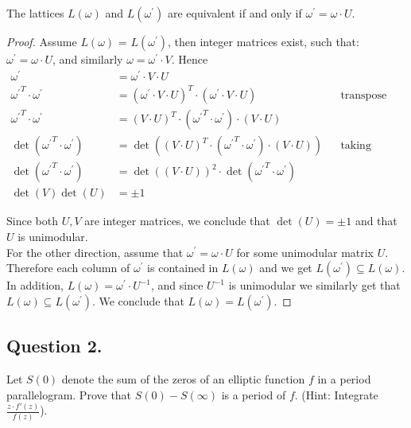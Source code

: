 \begin{proposition}
    The lattices $L(\omega)$ and $L(\omega^\prime)$ are equivalent if and only if $\omega^\prime = \omega \cdot U.$
\end{proposition}

\begin{proof}
    Assume $L(\omega)$ = $L(\omega^\prime)$, then integer matrices exist, such that:
    $\omega^\prime = \omega \cdot U$, and similarly $\omega = \omega^\prime \cdot V$. Hence
    \begin{align*}
        \omega^\prime &= \omega^\prime \cdot V \cdot U \\
        {\omega^\prime}^T \cdot \omega^\prime &= {(\omega^\prime \cdot V \cdot U)}^T \cdot (\omega^\prime \cdot V \cdot U) &&\text{transpose both sides} \\
        {\omega^\prime}^T \cdot \omega^\prime &= {(V \cdot U)}^T \cdot ({\omega^\prime}^T \cdot \omega^\prime) \cdot (V \cdot U)\\
        \det{({\omega^\prime}^T \cdot \omega^\prime)} &= \det{({(V \cdot U)}^T \cdot ({\omega^\prime}^T \cdot \omega^\prime) \cdot (V \cdot U))} &&\text{taking determinants} \\
        \det{({\omega^\prime}^T \cdot \omega^\prime)} &= \det{({(V \cdot U)})}^2 \cdot \det{({\omega^\prime}^T \cdot \omega^\prime)} \\
        \det{(V)}\det{(U)}  &= \pm 1
    \end{align*}

    Since both $U,V$ are integer matrices, we conclude that $\det{(U)} = \pm 1$ and that $U$ is unimodular.\\

    For the other direction, assume that $\omega^\prime = \omega \cdot U$ for some unimodular matrix $U$.
    Therefore each column of $\omega^\prime$ is contained in $L(\omega)$ and we get $L(\omega^\prime) \subseteq L(\omega)$.
    In addition, $L(\omega) = \omega^\prime \cdot U^{-1}$, and since $U^{-1}$ is unimodular we similarly get that
    $L(\omega) \subseteq L(\omega^\prime)$. We conclude that $L(\omega)=L(\omega^\prime)$.
\end{proof}


\subsection{Question 2.}
\noindent
Let $S(0)$ denote the sum of the zeros of an elliptic function $f$ in a period parallelogram. Prove that
$S(0)-S(\infty)$ is a period of $f$. (Hint: Integrate $\frac{z \cdot f'(z)}{f(z)}$).

